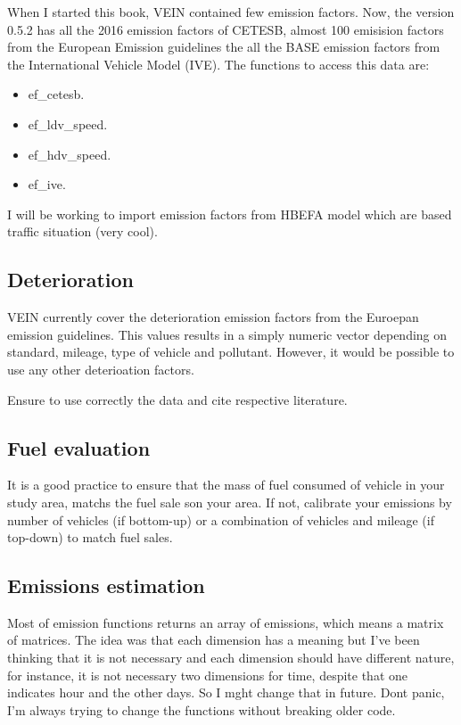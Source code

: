 \documentclass[12pt,graybox,envcountchap,sectrefs]{krantz}
\providecommand{\tightlist}{%
  \setlength{\itemsep}{0pt}\setlength{\parskip}{0pt}}
\theoremstyle{definition}
\theoremstyle{definition}
\theoremstyle{definition}
\theoremstyle{remark}
\begin{document}
When I started this book, VEIN contained few emission factors. Now, the
version 0.5.2 has all the 2016 emission factors of CETESB, almost 100
emisision factors from the European Emission guidelines the all the BASE
emission factors from the International Vehicle Model (IVE). The
functions to access this data are:

\begin{itemize}
\tightlist
\item
  ef\_cetesb.
\item
  ef\_ldv\_speed.
\item
  ef\_hdv\_speed.
\item
  ef\_ive.
\end{itemize}

I will be working to import emission factors from HBEFA model which are
based traffic situation (very cool).

\subsection{Deterioration}\label{deterioration}

VEIN currently cover the deterioration emission factors from the
Euroepan emission guidelines. This values results in a simply numeric
vector depending on standard, mileage, type of vehicle and pollutant.
However, it would be possible to use any other deterioation factors.

Ensure to use correctly the data and cite respective literature.

\subsection{Fuel evaluation}\label{fuel-evaluation}

It is a good practice to ensure that the mass of fuel consumed of
vehicle in your study area, matchs the fuel sale son your area. If not,
calibrate your emissions by number of vehicles (if bottom-up) or a
combination of vehicles and mileage (if top-down) to match fuel sales.

\subsection{Emissions estimation}\label{emissions-estimation}

Most of emission functions returns an array of emissions, which means a
matrix of matrices. The idea was that each dimension has a meaning but
I've been thinking that it is not necessary and each dimension should
have different nature, for instance, it is not necessary two dimensions
for time, despite that one indicates hour and the other days. So I mght
change that in future. Dont panic, I'm always trying to change the
functions without breaking older code.
\end{document}
